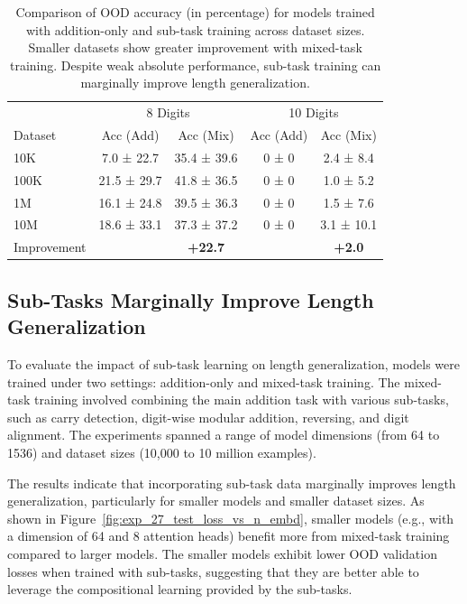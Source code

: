 \begin{table}[!h]
  \centering
  \caption{Comparison of OOD accuracy (in percentage) for models trained with addition-only and sub-task training across dataset sizes. Smaller datasets show greater improvement with mixed-task training. Despite weak absolute performance, sub-task training can marginally improve length generalization.}
  \label{tab:subtask_results}
  \begin{tabular}{lcccc}
                & \multicolumn{2}{c}{8 Digits} & \multicolumn{2}{c}{10 Digits}                             \\
    Dataset     & Acc (Add)                    & Acc (Mix)                     & Acc (Add) & Acc (Mix)     \\
    \midrule
    10K         & 7.0 ± 22.7                   & 35.4 ± 39.6                   & 0 ± 0     & 2.4 ± 8.4     \\
    100K        & 21.5 ± 29.7                  & 41.8 ± 36.5                   & 0 ± 0     & 1.0 ± 5.2     \\
    1M          & 16.1 ± 24.8                  & 39.5 ± 36.3                   & 0 ± 0     & 1.5 ± 7.6     \\
    10M         & 18.6 ± 33.1                  & 37.3 ± 37.2                   & 0 ± 0     & 3.1 ± 10.1    \\
    \midrule
    Improvement &                              & \textbf{+22.7}                &           & \textbf{+2.0} \\
    \bottomrule
  \end{tabular}
\end{table}

\subsection{Sub-Tasks Marginally Improve Length Generalization}

To evaluate the impact of sub-task learning on length generalization, models were trained under two settings: addition-only and mixed-task training. The mixed-task training involved combining the main addition task with various sub-tasks, such as carry detection, digit-wise modular addition, reversing, and digit alignment. The experiments spanned a range of model dimensions (from 64 to 1536) and dataset sizes (10,000 to 10 million examples).

The results indicate that incorporating sub-task data marginally improves length generalization, particularly for smaller models and smaller dataset sizes. As shown in Figure~\ref{fig:exp_27_test_loss_vs_n_embd}, smaller models (e.g., with a dimension of 64 and 8 attention heads) benefit more from mixed-task training compared to larger models. The smaller models exhibit lower OOD validation losses when trained with sub-tasks, suggesting that they are better able to leverage the compositional learning provided by the sub-tasks.

